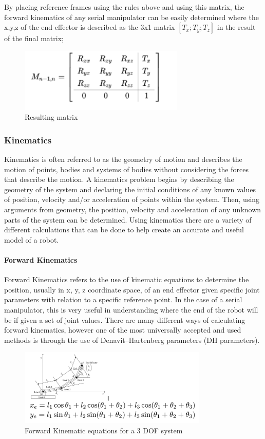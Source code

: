             By placing reference frames using the rules above and using this matrix, the forward kinematics of any serial manipulator can be easily determined where the x,y,z of the end effector is described as the 3x1 matrix $[T_x; T_y; T_z]$ in the result of the final matrix; 
            \begin{figure}[H]
                \centering
                \includegraphics[width=0.7\textwidth]{Matrix2.PNG}
                \caption{Resulting matrix}
                \label{fig:ResultingMatrix}
            \end{figure}
        \subsubsection{Kinematics}
        Kinematics is  often referred to as the geometry of motion and describes the motion of points, bodies and systems of bodies without considering the forces that describe the motion. A kinematics problem begins by describing the geometry of the system and declaring the initial conditions of any known values of position, velocity and/or acceleration of points within the system. Then, using arguments from geometry, the position, velocity and acceleration of any unknown parts of the system can be determined. Using kinematics there are a variety of different calculations that can be done to help create an accurate and useful model of a robot. 
            \paragraph*{Forward Kinematics}
            Forward Kinematics refers to the use of kinematic equations to determine the position, usually in x, y, z coordinate space, of an end effector given specific joint parameters with relation to a specific reference point. In the case of a serial manipulator, this is very useful in understanding where the end of the robot will be if given a set of joint values. There are many different ways of calculating forward kinematics, however one of the most universally accepted and used methods is through the use of Denavit–Hartenberg parameters (DH parameters).
            \begin{figure}[H]
                \centering
                \includegraphics[width=0.8\textwidth]{3dof.PNG}
                \caption{Forward Kinematic equations for a 3 DOF system}
                \label{fig:FWKIN_3DOF}
            \end{figure}
